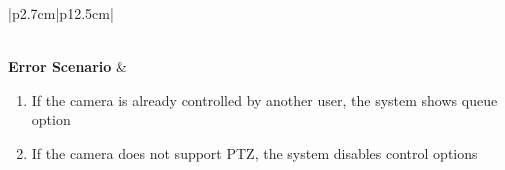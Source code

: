 \begin{table}[H]
\begin{tabular}{|p{2.7cm}|p{12.5cm}|}
\begin{minipage}[t]{\linewidth}
                                      \end{minipage}               \\
            \hline
            \textbf{Error Scenario} & \begin{minipage}[t]{\linewidth}
                                          \begin{enumerate}[topsep=0pt,itemsep=1pt,parsep=0pt,partopsep=0pt]
                                              \item If the camera is already controlled by another user, the system shows queue
                                                    option
                                              \item If the camera does not support PTZ, the system disables control options
                                          \end{enumerate}
                                      \end{minipage} \\
            \hline
        \end{tabular}
        \label{tab:eng-acquire-camera}
    \end{table}
